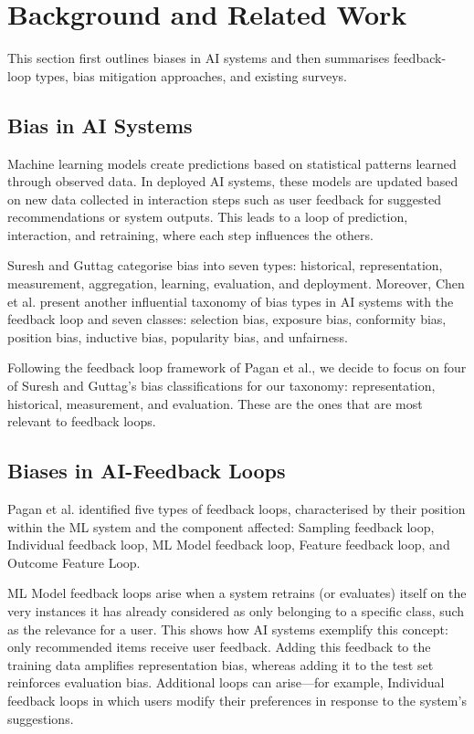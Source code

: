 \documentclass[11pt]{article}
\begin{document}
\section{Background and Related Work}

This section first outlines biases in AI systems and then summarises feedback-loop types, bias mitigation approaches, and existing surveys.

\subsection{Bias in AI Systems}

Machine learning models create predictions based on statistical patterns learned through observed data. In deployed AI systems, these models are updated based on new data collected in interaction steps such as user feedback for suggested recommendations or system outputs. This leads to a loop of prediction, interaction, and retraining, where each step influences the others.

Suresh and Guttag categorise bias into seven types: historical, representation, measurement, aggregation, learning, evaluation, and deployment. Moreover, Chen et al. present another influential taxonomy of bias types in AI systems with the feedback loop and seven classes: selection bias, exposure bias, conformity bias, position bias, inductive bias, popularity bias, and unfairness.

Following the feedback loop framework of Pagan et al., we decide to focus on four of Suresh and Guttag's bias classifications for our taxonomy: representation, historical, measurement, and evaluation. These are the ones that are most relevant to feedback loops.

\subsection{Biases in AI-Feedback Loops}

Pagan et al. identified five types of feedback loops, characterised by their position within the ML system and the component affected: Sampling feedback loop, Individual feedback loop, ML Model feedback loop, Feature feedback loop, and Outcome Feature Loop.

ML Model feedback loops arise when a system retrains (or evaluates) itself on the very instances it has already considered as only belonging to a specific class, such as the relevance for a user. This shows how AI systems exemplify this concept: only recommended items receive user feedback. Adding this feedback to the training data amplifies representation bias, whereas adding it to the test set reinforces evaluation bias. Additional loops can arise---for example, Individual feedback loops in which users modify their preferences in response to the system's suggestions.
\end{document}
